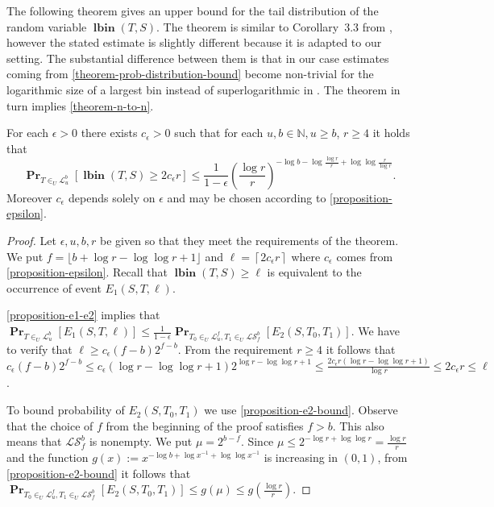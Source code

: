 \documentclass[unicode,review]{siamart1116}
\newcommand{\lbin}[2]{\operatorname{\mathbf{lbin}}({#1}, {#2})}
\newcommand{\linearmaps}[2]{\mathcal{L}_{#1}^{#2}}
\newcommand{\surjectivelinearmaps}[2]{\mathcal{LS}_{#1}^{#2}}
\newcommand{\probs}[2]{\operatorname{\mathbf{Pr}}_{{#1}}\left[{#2}\right]}
\numberwithin{theorem}{section}
\begin{document}
The following theorem gives an upper bound for the tail distribution of the random variable $\lbin{T}{S}$.
The theorem is similar to Corollary~3.3 from \cite{alonetal}, however the stated estimate is slightly different because it is adapted to our setting.
The substantial difference between them is that in our case estimates coming from \cref{theorem-prob-distribution-bound} become non-trivial for the logarithmic size of a largest bin instead of superlogarithmic in \cite{alonetal}.
The theorem in turn implies \cref{theorem-n-to-n}.

\begin{theorem}
\label{theorem-prob-distribution-bound}
For each $\epsilon > 0$ there exists $c_\epsilon > 0$ such that for each $u, b \in \mathbb{N}, u \geq b$, $r \geq 	 4$ it holds that
\[
\probs{T \in_U \linearmaps{u}{b}}{\lbin{T}{S} \geq 2 c_\epsilon r} \leq \frac{1}{1 - \epsilon}\left(\frac{\log r}{r}\right)^{-\log b - \log \frac{\log r}{r} + \log \log \frac{r}{\log r}}.
\]
Moreover $c_\epsilon$ depends solely on $\epsilon$ and may be chosen according to \cref{proposition-epsilon}.
\end{theorem}
\begin{proof}
Let $\epsilon, u, b, r$ be given so that they meet the requirements of the theorem.
We put $f = \lfloor b + \log r - \log \log r + 1 \rfloor$ and $\ell = \left \lceil 2c_\epsilon r \right\rceil$ where $c_\epsilon$ comes from \cref{proposition-epsilon}.
Recall that $\lbin{T}{S} \geq \ell$ is equivalent to the occurrence of event $E_1(S, T, \ell)$.

\cref{proposition-e1-e2} implies that $\probs{T \in_U \linearmaps{u}{b}}{E_1(S, T, \ell)} \leq \frac{1}{1 - \epsilon}\probs{T_0 \in_U \linearmaps{u}{f}, T_1 \in_U \surjectivelinearmaps{f}{b}}{E_2(S, T_0, T_1)}$.
We have to verify that $\ell \geq c_\epsilon (f - b)2^{f - b}$.
From the requirement $r \geq 4$ it follows that $c_\epsilon(f - b)2^{f - b} \leq c_\epsilon(\log r - \log \log r + 1)2^{\log r - \log \log r + 1} \leq \frac{2c_\epsilon r(\log r - \log \log r + 1)}{\log r} \leq 2c_\epsilon r \leq \ell$.

To bound probability of $E_2(S, T_0, T_1)$ we use \cref{proposition-e2-bound}.
Observe that the choice of $f$ from the beginning of the proof satisfies $f > b$.
This also means that $\surjectivelinearmaps{f}{b}$ is nonempty. 
We put $\mu = 2^{b - f}$.
Since $\mu \leq 2^{-\log r + \log \log r} = \frac{\log r}{r}$ and the function $g(x) := x ^ {- \log b + \log x^{-1} + \log \log x^{-1}}$ is increasing in $(0, 1)$, from \cref{proposition-e2-bound} it follows that $\probs{T_0 \in_U \linearmaps{u}{f}, T_1 \in_U \surjectivelinearmaps{f}{b}}{E_2(S, T_0, T_1)} \leq g(\mu) \leq g\left(\frac{\log r}{r}\right)$.
\end{proof}
\end{document}
